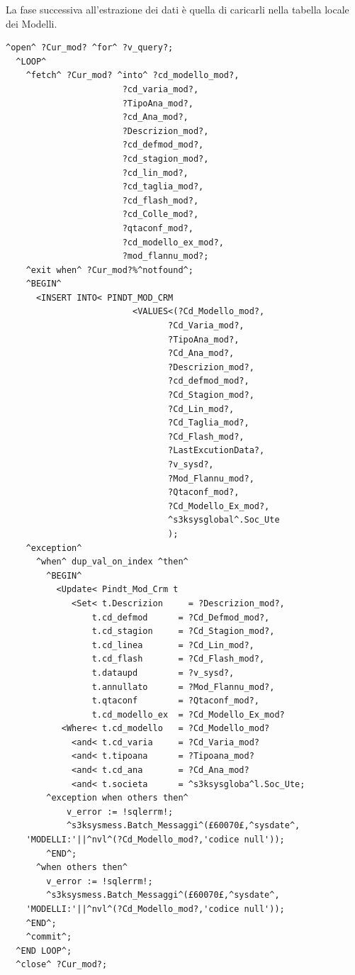 \newpage
La fase successiva all'estrazione dei dati è quella di caricarli nella tabella locale dei Modelli.
\begin{lstlisting}[frame=single,style=base]
^open^ ?Cur_mod? ^for^ ?v_query?;
  ^LOOP^
    ^fetch^ ?Cur_mod? ^into^ ?cd_modello_mod?,
                       ?cd_varia_mod?,
                       ?TipoAna_mod?,
                       ?cd_Ana_mod?,
                       ?Descrizion_mod?,
                       ?cd_defmod_mod?,
                       ?cd_stagion_mod?,
                       ?cd_lin_mod?,
                       ?cd_taglia_mod?,
                       ?cd_flash_mod?,
                       ?cd_Colle_mod?,
                       ?qtaconf_mod?,
                       ?cd_modello_ex_mod?,
                       ?mod_flannu_mod?;
    ^exit when^ ?Cur_mod?%^notfound^;
    ^BEGIN^
      <INSERT INTO< PINDT_MOD_CRM
                         <VALUES<(?Cd_Modello_mod?,
                                ?Cd_Varia_mod?,
                                ?TipoAna_mod?,
                                ?Cd_Ana_mod?,
                                ?Descrizion_mod?,
                                ?cd_defmod_mod?,
                                ?Cd_Stagion_mod?,
                                ?Cd_Lin_mod?,
                                ?Cd_Taglia_mod?,
                                ?Cd_Flash_mod?,
                                ?LastExcutionData?,
                                ?v_sysd?,
                                ?Mod_Flannu_mod?,
                                ?Qtaconf_mod?,
                                ?Cd_Modello_Ex_mod?,
                                ^s3ksysglobal^.Soc_Ute
                                );
    ^exception^
      ^when^ dup_val_on_index ^then^
        ^BEGIN^
          <Update< Pindt_Mod_Crm t 
             <Set< t.Descrizion     = ?Descrizion_mod?,
                 t.cd_defmod      = ?Cd_Defmod_mod?,
                 t.cd_stagion     = ?Cd_Stagion_mod?,
                 t.cd_linea       = ?Cd_Lin_mod?,
                 t.cd_flash       = ?Cd_Flash_mod?,
                 t.dataupd        = ?v_sysd?,
                 t.annullato      = ?Mod_Flannu_mod?,
                 t.qtaconf        = ?Qtaconf_mod?,
                 t.cd_modello_ex  = ?Cd_Modello_Ex_mod?
           <Where< t.cd_modello   = ?Cd_Modello_mod?
             <and< t.cd_varia     = ?Cd_Varia_mod?
             <and< t.tipoana      = ?Tipoana_mod?
             <and< t.cd_ana       = ?Cd_Ana_mod?
             <and< t.societa      = ^s3ksysgloba^l.Soc_Ute;
        ^exception when others then^
            v_error := !sqlerrm!;
            ^s3ksysmess.Batch_Messaggi^(£60070£,^sysdate^,
	'MODELLI:'||^nvl^(?Cd_Modello_mod?,'codice null'));
        ^END^;
      ^when others then^
        v_error := !sqlerrm!;
        ^s3ksysmess.Batch_Messaggi^(£60070£,^sysdate^,
	'MODELLI:'||^nvl^(?Cd_Modello_mod?,'codice null'));
    ^END^;
    ^commit^;
  ^END LOOP^;
  ^close^ ?Cur_mod?;
\end{lstlisting}

